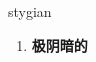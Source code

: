 
\begin{frame}
{\huge stygian}
\begin{center}
\begin{enumerate}\Large
  \item \textbf{极阴暗的}
\end{enumerate}
\end{center}
\end{frame}

